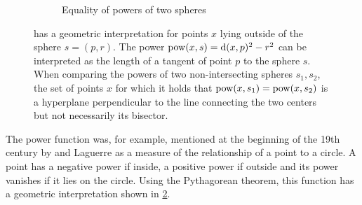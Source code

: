 \begin{figure}[tb]
\begin{subfigure}[b]{.45\linewidth}
        \caption{Equality of powers of two spheres}
        \label{sfig:chordal}
    \end{subfigure}
    \caption{ has a geometric interpretation for points $x$ lying outside of the sphere $s=(p, r)$. The power $\operatorname{pow}(x, s) = \operatorname{d}(x, p)^2 - r^2$ can be interpreted as the length of a tangent of point $p$ to the sphere $s$. When comparing the powers of two non-intersecting spheres $s_1, s_2$, the set of points $x$ for which it holds that $\operatorname{pow}(x, s_1) = \operatorname{pow}(x, s_2)$ is a hyperplane perpendicular to the line connecting the two centers but not necessarily its bisector.}
    \label{fig:power}
\end{figure}

The power function was, for example, mentioned at the beginning of the 19th century by \textcite{steiner1881jacob} and Laguerre \cite{blaschke2013vorlesungen} as a measure of the relationship of a point to a circle.
A point has a negative power if inside, a positive power if outside and its power vanishes if it lies on the circle.
Using the Pythagorean theorem, this function has a geometric interpretation shown in \cref{fig:power}.

